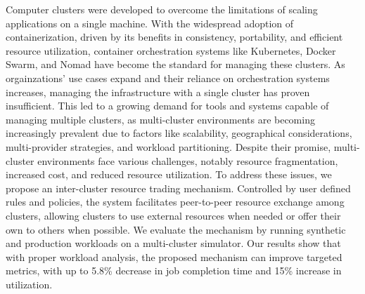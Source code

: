 Computer clusters were developed to overcome the limitations of scaling
applications on a single machine. With the widespread adoption of
containerization, driven by its benefits in consistency, portability, and
efficient resource utilization, container orchestration systems like
Kubernetes, Docker Swarm, and Nomad have become the standard for managing these
clusters. As orgainzations' use cases expand and their reliance on orchestration
systems increases, managing the infrastructure with a single cluster has proven
insufficient. This led to a growing demand for tools and systems capable of
managing multiple clusters, as multi-cluster environments are becoming
increasingly prevalent due to factors like scalability, geographical
considerations, multi-provider strategies, and workload partitioning. Despite
their promise, multi-cluster environments face various challenges, notably
resource fragmentation, increased cost, and reduced resource utilization. To
address these issues, we propose an inter-cluster resource trading mechanism.
Controlled by user defined rules and policies, the system facilitates
peer-to-peer resource exchange among clusters, allowing clusters to use
external resources when needed or offer their own to others when possible. We
evaluate the mechanism by running synthetic and production workloads on a
multi-cluster simulator. Our results show that with proper workload analysis,
the proposed mechanism can improve targeted metrics, with up to 5.8\% decrease
in job completion time and 15\% increase in utilization. 
